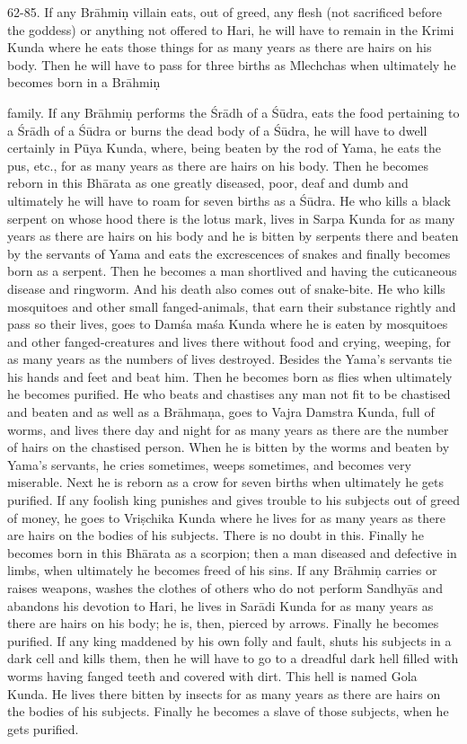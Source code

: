62-85. If any Br\=ahmi\d{n} villain eats, out of greed, any flesh (not sacrificed before the goddess) or anything not offered to Hari, he will have to remain in the Krimi Kunda where he eats those things for as many years as there are hairs on his body. Then he will have to pass for three births as Mlechchas when ultimately he becomes born in a Br\=ahmi\d{n}

family. If any Br\=ahmi\d{n} performs the \'Sr\=adh of a \'S\=udra, eats the food pertaining to a \'Sr\=adh of a \'S\=udra or burns the dead body of a \'S\=udra, he will have to dwell certainly in P\=uya Kunda, where, being beaten by the rod of Yama, he eats the pus, etc., for as many years as there are hairs on his body. Then he becomes reborn in this Bh\=arata as one greatly diseased, poor, deaf and dumb and ultimately he will have to roam for seven births as a \'S\=udra. He who kills a black serpent on whose hood there is the lotus mark, lives in Sarpa Kunda for as many years as there are hairs on his body and he is bitten by serpents there and beaten by the servants of Yama and eats the excrescences of snakes and finally becomes born as a serpent. Then he becomes a man shortlived and having the cuticaneous disease and ringworm. And his death also comes out of snake-bite. He who kills mosquitoes and other small fanged-animals, that earn their substance rightly and pass so their lives, goes to Dam\'sa ma\'sa Kunda where he is eaten by mosquitoes and other fanged-creatures and lives there without food and crying, weeping, for as many years as the numbers of lives destroyed. Besides the Yama's servants tie his hands and feet and beat him. Then he becomes born as flies when ultimately he becomes purified. He who beats and chastises any man not fit to be chastised and beaten and as well as a Br\=ahma\d{n}a, goes to Vajra Damstra Kunda, full of worms, and lives there day and night for as many years as there are the number of hairs on the chastised person. When he is bitten by the worms and beaten by Yama's servants, he cries sometimes, weeps sometimes, and becomes very miserable. Next he is reborn as a crow for seven births when ultimately he gets purified. If any foolish king punishes and gives trouble to his subjects out of greed of money, he goes to Vri\d{s}chika Kunda where he lives for as many years as there are hairs on the bodies of his subjects. There is no doubt in this. Finally he becomes born in this Bh\=arata as a scorpion; then a man diseased and defective in limbs, when ultimately he becomes freed of his sins. If any Br\=ahmi\d{n} carries or raises weapons, washes the clothes of others who do not perform Sandhy\=as and abandons his devotion to Hari, he lives in Sar\=adi Kunda for as many years as there are hairs on his body; he is, then, pierced by arrows. Finally he becomes purified. If any king maddened by his own folly and fault, shuts his subjects in a dark cell and kills them, then he will have to go to a dreadful dark hell filled with worms having fanged teeth and covered with dirt. This hell is named Gola Kunda. He lives there bitten by insects for as many years as there are hairs on the bodies of his subjects. Finally he becomes a slave of those subjects, when he gets purified.

